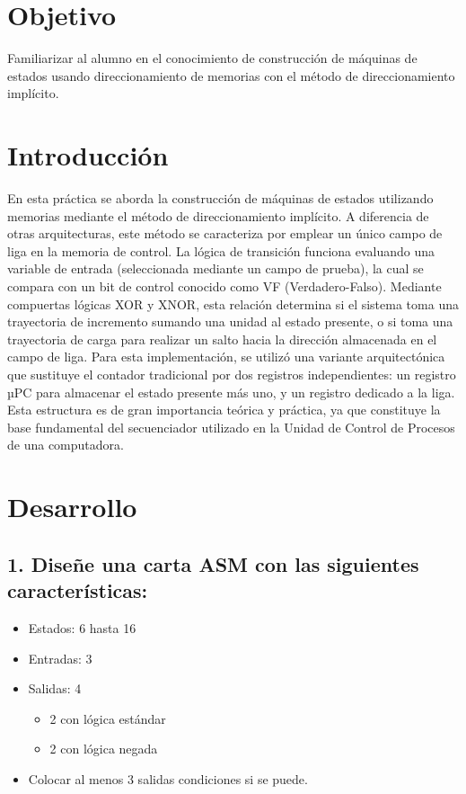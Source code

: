 \documentclass[12pt, letterpaper]{article}
\begin{document}


\section*{Objetivo}

Familiarizar al alumno en el conocimiento de construcción de máquinas de estados usando direccionamiento de memorias con el método de direccionamiento implícito.

\section*{Introducción}

En esta práctica se aborda la construcción de máquinas de estados utilizando memorias mediante el método de direccionamiento implícito. A diferencia de otras arquitecturas, este método se caracteriza por emplear un único campo de liga en la memoria de control. La lógica de transición funciona evaluando una variable de entrada (seleccionada mediante un campo de prueba), la cual se compara con un bit de control conocido como VF (Verdadero-Falso). Mediante compuertas lógicas XOR y XNOR, esta relación determina si el sistema toma una trayectoria de incremento sumando una unidad al estado presente, o si toma una trayectoria de carga para realizar un salto hacia la dirección almacenada en el campo de liga. Para esta implementación, se utilizó una variante arquitectónica que sustituye el contador tradicional por dos registros independientes: un registro µPC para almacenar el estado presente más uno, y un registro dedicado a la liga. Esta estructura es de gran importancia teórica y práctica, ya que constituye la base fundamental del secuenciador utilizado en la Unidad de Control de Procesos de una computadora.

\section*{Desarrollo}

\subsection*{1. Diseñe una carta ASM con las siguientes características:}

\begin{itemize}
    \item Estados: 6 hasta 16
    \item Entradas: 3
    \item Salidas: 4
    \begin{itemize}
        \item 2 con lógica estándar
        \item 2 con lógica negada
    \end{itemize}
    \item Colocar al menos 3 salidas condiciones si se puede.
\end{itemize}
\end{document}
